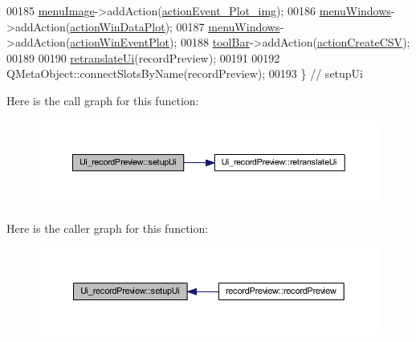 \begin{DoxyCode}
00185         \hyperlink{a00081_af1ff1ecbe6ea007cfeda320cca9865b7}{menuImage}->addAction(\hyperlink{a00081_a789f5466c7f1781c13d4d027e982ca55}{actionEvent\_Plot\_img});
00186         \hyperlink{a00081_afd93511da273fc2c6a88472d154cb176}{menuWindows}->addAction(\hyperlink{a00081_aa09067a9c96c9cd78f75261a9fcb89f0}{actionWinDataPlot});
00187         \hyperlink{a00081_afd93511da273fc2c6a88472d154cb176}{menuWindows}->addAction(\hyperlink{a00081_ac72ec9c8679d46fd43a87f99ee6db893}{actionWinEventPlot});
00188         \hyperlink{a00081_ac94509c2cd16337592e1634b0f2a6020}{toolBar}->addAction(\hyperlink{a00081_ae81b7303db9e9c5d730c59b86ec0e960}{actionCreateCSV});
00189 
00190         \hyperlink{a00081_ad30b831cfb4b32956fe67a79748ba194}{retranslateUi}(recordPreview);
00191 
00192         QMetaObject::connectSlotsByName(recordPreview);
00193     \} \textcolor{comment}{// setupUi}
\end{DoxyCode}


Here is the call graph for this function\+:
\nopagebreak
\begin{figure}[H]
\begin{center}
\leavevmode
\includegraphics[width=350pt]{d8/d53/a00081_afa41dc070a896a5eae476f3c0206825c_cgraph}
\end{center}
\end{figure}




Here is the caller graph for this function\+:
\nopagebreak
\begin{figure}[H]
\begin{center}
\leavevmode
\includegraphics[width=350pt]{d8/d53/a00081_afa41dc070a896a5eae476f3c0206825c_icgraph}
\end{center}
\end{figure}




